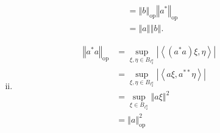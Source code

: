 \documentclass[8pt]{extarticle}
\newcommand{\iprod}[2]{\left\langle #1,#2\right\rangle}
\newcommand{\norm}[1]{\left\Vert #1\right\Vert}
\begin{document}
\begin{description}
\begin{enumerate}[(i)]
\begin{align*}
                                  &= \norm{b}_{\text{op}}\norm{a^{\ast}}_{\text{op}}\\
                                  &= \norm{a}\norm{b}.
          \end{align*}
        \item 
          \begin{align*}
            \norm{a^{\ast}a}_{\text{op}} &= \sup_{\xi,\eta\in B_{\ell_2^n}}|\iprod{(a^{\ast}a)\xi}{\eta}|\\
                                         &= \sup_{\xi,\eta \in B_{\ell_2^n}}|\iprod{a\xi}{a^{\ast\ast}\eta}|\\
                                         &= \sup_{\xi\in B_{\ell_2^n}}\norm{a\xi}^{2}\\
                                         &= \norm{a}_{\text{op}}^{2}
          \end{align*}
      \end{enumerate}
  \end{description}
\end{document}
